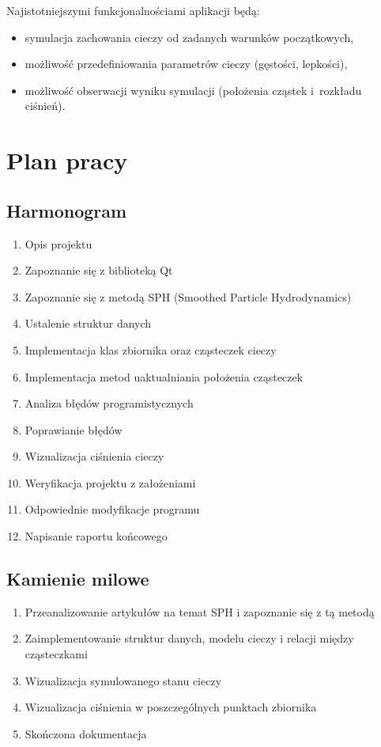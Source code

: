 \documentclass[a4paper]{article}
\begin{document}
Najistotniejszymi funkcjonalnościami aplikacji będą:
\begin{itemize}
  \item symulacja zachowania cieczy od zadanych warunków początkowych,
  \item możliwość przedefiniowania parametrów cieczy (gęstości, lepkości),
  \item możliwość obserwacji wyniku symulacji (położenia cząstek i~rozkładu ciśnień).
\end{itemize}

\section{Plan pracy}
\subsection{Harmonogram}
\begin{enumerate}[label=Z\arabic*{.}]
  \item Opis projektu
  \item Zapoznanie się z biblioteką Qt
  \item Zapoznanie się z metodą SPH (Smoothed Particle Hydrodynamics)
  \item Ustalenie struktur danych
  \item Implementacja klas zbiornika oraz cząsteczek cieczy 
  \item Implementacja metod uaktualniania położenia cząsteczek
  \item Analiza błędów programistycznych
  \item Poprawianie błędów
  \item Wizualizacja ciśnienia cieczy
  \item Weryfikacja projektu z założeniami
  \item Odpowiednie modyfikacje programu
  \item Napisanie raportu końcowego
\end{enumerate}

\subsection{Kamienie milowe}
\begin{enumerate}[label=K\arabic*{.}]
  \item Przeanalizowanie artykułów na temat SPH i zapoznanie się z tą metodą
  \item Zaimplementowanie struktur danych, modelu cieczy i relacji między cząsteczkami
  \item Wizualizacja symulowanego stanu cieczy
  \item Wizualizacja ciśnienia w poszczególnych punktach zbiornika
  \item Skończona dokumentacja
\end{enumerate}
\end{document}
